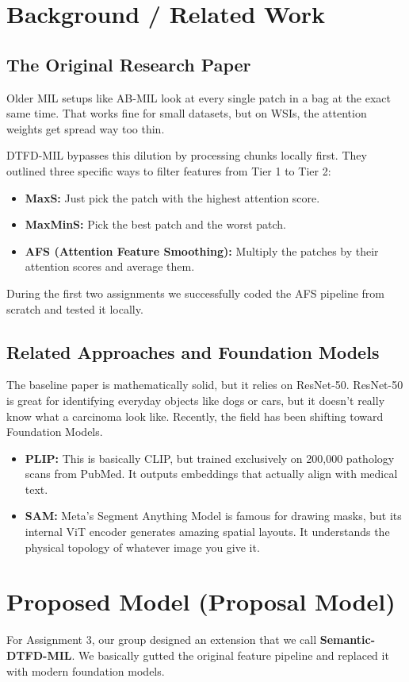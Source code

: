 \documentclass[12pt, a4paper]{article}
\begin{document}
\section{Background / Related Work}
\subsection{The Original Research Paper}
Older MIL setups like AB-MIL look at every single patch in a bag at the exact same time. That works fine for small datasets, but on WSIs, the attention weights get spread way too thin. 

DTFD-MIL bypasses this dilution by processing chunks locally first. They outlined three specific ways to filter features from Tier 1 to Tier 2:
\begin{itemize}
    \item \textbf{MaxS:} Just pick the patch with the highest attention score.
    \item \textbf{MaxMinS:} Pick the best patch and the worst patch.
    \item \textbf{AFS (Attention Feature Smoothing):} Multiply the patches by their attention scores and average them.
\end{itemize}
During the first two assignments we successfully coded the AFS pipeline from scratch and tested it locally.

\subsection{Related Approaches and Foundation Models}
The baseline paper is mathematically solid, but it relies on ResNet-50. ResNet-50 is great for identifying everyday objects like dogs or cars, but it doesn't really know what a carcinoma look like. Recently, the field has been shifting toward Foundation Models.
\begin{itemize}
    \item \textbf{PLIP:} This is basically CLIP, but trained exclusively on 200,000 pathology scans from PubMed. It outputs embeddings that actually align with medical text.
    \item \textbf{SAM:} Meta's Segment Anything Model is famous for drawing masks, but its internal ViT encoder generates amazing spatial layouts. It understands the physical topology of whatever image you give it.
\end{itemize}

\section{Proposed Model (Proposal Model)}
For Assignment 3, our group designed an extension that we call \textbf{Semantic-DTFD-MIL}. We basically gutted the original feature pipeline and replaced it with modern foundation models.
\end{document}
